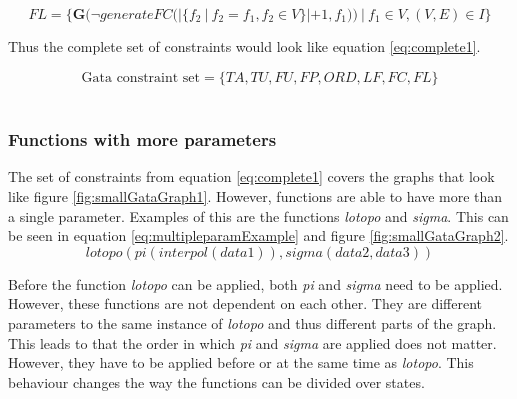 \documentclass{article}
\begin{document}
\begin{equation}
    FL = \{ \textbf{G}( \neg  generateFC(|\{ f_2\ |\ f_2 = f_1, f_2 \in V \}| +1, f_1))\ |\ f_1 \in V, (V,E) \in  I \} \label{eq:functionlimiting}
\end{equation}


Thus the complete set of constraints would look like equation \ref{eq:complete1}.

\begin{equation}
    \text{Gata constraint set}= \{TA, TU, FU, FP, ORD, LF, FC,FL\} \label{eq:complete1}
\end{equation}
 \\
 
 


\subsubsection{Functions with more parameters}

The set of constraints from equation \ref{eq:complete1} covers the graphs that look like figure \ref{fig:smallGataGraph1}. However, functions are able to have more than a single parameter. Examples of this are the functions \textit{lotopo} and \textit{sigma}. This can be seen in equation \ref{eq:multipleparamExample} and figure \ref{fig:smallGataGraph2}. 
\begin{equation}
lotopo(pi(interpol(data1)),sigma(data2,data3)) \label{eq:multipleparamExample}
\end{equation}

Before the function \textit{lotopo} can be applied, both \textit{pi} and \textit{sigma} need to be applied. However, these functions are not dependent on each other. They are different parameters to the same instance of \textit{lotopo} and thus different parts of the graph. This leads to that the order in which \textit{pi} and \textit{sigma} are applied does not matter. However, they have to be applied before or at the same time as \textit{lotopo}. This behaviour changes the way the functions can be divided over states.
\end{document}

